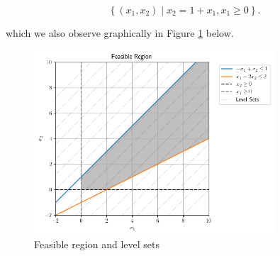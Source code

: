 \begin{solution}
  $$
  \left\{ (x_1, x_2) \mid x_2 = 1 + x_1, x_1 \ge 0 \right\}.
  $$

  which we also observe graphically in Figure \ref{fig:problem_2_feasible_region} below.
  \vfill

  \begin{figure}[h]
    \centering
    \includegraphics*[width=0.8\textwidth]{problem_2.png}
    \caption{Feasible region and level sets}
    \label{fig:problem_2_feasible_region}
  \end{figure}
  \ \\
\end{solution}
